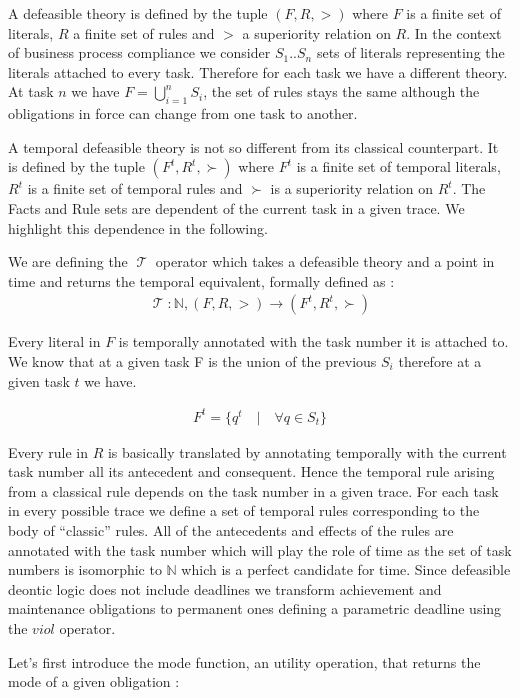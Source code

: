 \documentclass[10pt]{report}
\DeclareMathOperator{\tempop}{\mathscr{T}}
\begin{document}
A defeasible theory is defined by the tuple $(F, R, >)$ where $F$ is a finite set of literals, $R$ a finite set of rules and $>$ a superiority relation on $R$. In the context of business process compliance we consider $S_{1}..S_{n}$ sets of literals representing the literals attached to every task. Therefore for each task we have a different theory. At task $n$ we have $F = \bigcup \limits _{i=1}^n S_{i}$, the set of rules stays the same although the obligations in force can change from one task to another.

A temporal defeasible theory is not so different from its classical counterpart. It is defined by the tuple $(F^{t}, R^{t}, \succ)$ where $F^{t}$ is a finite set of temporal literals, $R^{t}$ is a finite set of temporal rules and $\succ$ is a superiority relation on $R^{t}$. The Facts and Rule sets are dependent of the current task in a given trace. We highlight this dependence in the following.

We are defining the $\tempop$ operator which takes a defeasible theory and a point in time and returns the temporal equivalent, formally defined as : 
\begin{gather}
\tempop : \mathbb{N}, (F, R, >) \rightarrow (F^{t}, R^{t}, \succ)
\end{gather}

Every literal in $F$ is temporally annotated with the task number it is attached to. We know that at a given task F is the union of the previous $S_{i}$ therefore at a given task $t$ we have. 

\begin{gather}
F^{t} = \{q^{t} \quad | \quad \forall q \in S_{t} \}
\end{gather}

Every rule in $R$ is basically translated by annotating temporally with the current task number all its antecedent and consequent. Hence the temporal rule arising from a classical rule depends on the task number in a given trace. For each task in every possible trace we define a set of temporal rules corresponding to the body of \enquote{classic} rules. All of the antecedents and effects of the rules are annotated with the task number which will play the role of time as the set of task numbers is isomorphic to $\mathbb{N}$ which is a perfect candidate for time. Since defeasible deontic logic does not include deadlines we transform achievement and maintenance obligations to permanent ones defining a parametric deadline using the $viol$ operator.

Let's first introduce the mode function, an utility operation, that returns the mode of a given obligation :
\end{document}
